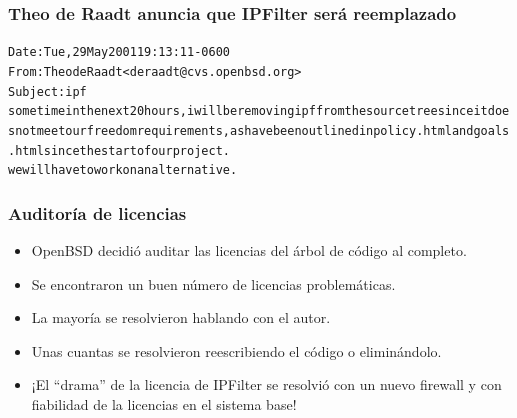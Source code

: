 \documentclass{beamer}
\begin{document}

\begin{frame}
\frametitle{Theo de Raadt anuncia que IPFilter será reemplazado}

\begin{alltt}
\footnotesize


Date: Tue, 29 May 2001 19:13:11 -0600 \\
From: Theo de Raadt <deraadt@cvs.openbsd.org> \\
Subject: ipf \\

sometime in the next 20 hours, i will be removing ipf from the source tree since it does not meet our freedom requirements, as have been outlined in policy.html and goals.html since the start of our project. \\

we will have to work on an alternative.

\end{alltt}

\end{frame}



\begin{frame}
\frametitle{Auditoría de licencias}

\begin{itemize}
\item OpenBSD decidió auditar las licencias del árbol de código al completo.
\item Se encontraron un buen número de licencias problemáticas.
\item La mayoría se resolvieron hablando con el autor.
\item Unas cuantas se resolvieron reescribiendo el código o eliminándolo.
\item ¡El ``drama'' de la licencia de IPFilter se resolvió con un nuevo firewall y con fiabilidad de la licencias en el sistema base!
\end{itemize}

\end{frame}


\end{document}
